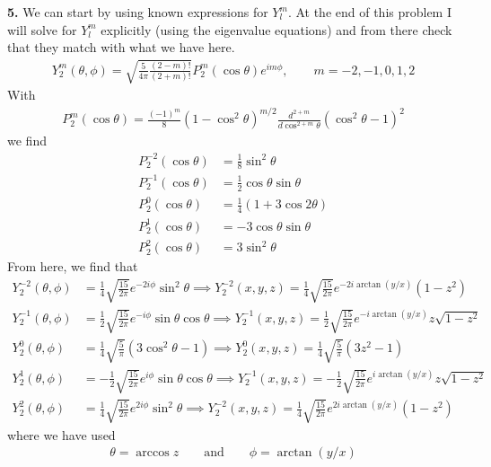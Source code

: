 \documentclass{article}
\theoremstyle{definition}
\newcommand{\f}[2]{\frac{#1}{#2}}
\begin{document}
\noindent \textbf{5. } We can start by using known expressions for $Y^m_l$. At the end of this problem I will solve for $Y^m_l$ explicitly (using the eigenvalue equations) and from there check that they match with what we have here. 
\begin{align*}
Y_2^m(\theta,\phi) = \sqrt{\f{5}{4\pi} \f{(2-m)!}{(2+m)!}} P^m_2(\cos\theta)e^{im\phi}, \quad\quad m = -2,-1,0,1,2
\end{align*}
With 
\begin{align*}
P^m_2(\cos\theta) = \f{(-1)^m}{8}(1-\cos^2\theta)^{m/2}\f{d^{2+m}}{d\cos^{2+m}\theta}(\cos^2\theta - 1)^2
\end{align*}
we find 
\begin{align*}
P^{-2}_2(\cos\theta) &= \f{1}{8}\sin^2\theta\\
P^{-1}_2(\cos\theta) &= \f{1}{2}\cos\theta\sin\theta\\
P^{0}_2(\cos\theta) &= \f{1}{4}(1+3\cos2\theta)\\
P^{1}_2(\cos\theta) &= -3\cos\theta\sin\theta\\
P^{2}_2(\cos\theta) &= 3\sin^2\theta
\end{align*}
From here, we find that
\begin{align*}
Y^{-2}_2(\theta,\phi) &= \frac{1}{4} \sqrt{\frac{15}{2 \pi }} e^{-2 i \phi } \sin ^2\theta  
\implies Y^{-2}_2(x,y,z) =  \frac{1}{4} \sqrt{\frac{15}{2 \pi }} e^{-2 i \arctan(y/x) } (1-z^2)\\
Y^{-1}_2(\theta,\phi) &= \frac{1}{2} \sqrt{\frac{15}{2 \pi }} e^{-i \phi } \sin \theta  \cos \theta 
\implies Y^{-1}_2(x,y,z) = \frac{1}{2} \sqrt{\frac{15}{2 \pi }} e^{-i \arctan(y/x) } z\sqrt{1-z^2} \\
Y^{0}_2(\theta,\phi) &= \frac{1}{4} \sqrt{\frac{5}{\pi }} \left(3 \cos ^2\theta -1\right)
\implies Y^{0}_2(x,y,z) =   \frac{1}{4} \sqrt{\frac{5}{\pi }} \left(3 z^2 -1\right) \\
Y^{1}_2(\theta,\phi) &= -\frac{1}{2} \sqrt{\frac{15}{2 \pi }} e^{i \phi } \sin \theta  \cos \theta 
\implies  Y^{-1}_2(x,y,z) = -\frac{1}{2} \sqrt{\frac{15}{2 \pi }} e^{i \arctan(y/x) } z\sqrt{1-z^2}
\\
Y^{2}_2(\theta,\phi) &= \frac{1}{4} \sqrt{\frac{15}{2 \pi }} e^{2 i \phi } \sin ^2\theta 
\implies Y^{-2}_2(x,y,z) =  \frac{1}{4} \sqrt{\frac{15}{2 \pi }} e^{2 i \arctan(y/x) } (1-z^2)
\end{align*}
where we have used
\begin{align*}
\theta = \arccos z\quad\quad \text{and}\quad\quad \phi = \arctan(y/x)
\end{align*}
\end{document}
